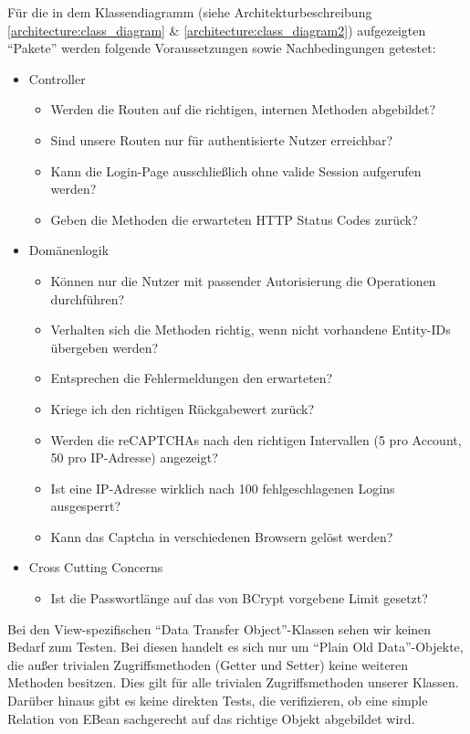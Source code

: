 \documentclass[12pt,DIV14,BCOR10mm,a4paper,parskip=half-,headsepline,headinclude,english,ngerman,bibliography=totocnumbered]{scrreprt}
\begin{document}

Für die in dem Klassendiagramm (siehe Architekturbeschreibung \ref{architecture:class_diagram} \& \ref{architecture:class_diagram2}) aufgezeigten \enquote{Pakete} werden folgende Voraussetzungen sowie Nachbedingungen getestet:

\begin{itemize}
  \item Controller
  \begin{itemize}
    \item Werden die Routen auf die richtigen, internen Methoden abgebildet?
    \item Sind unsere Routen nur für authentisierte Nutzer erreichbar?
    \item Kann die Login-Page ausschließlich ohne valide Session aufgerufen werden?
    \item Geben die Methoden die erwarteten HTTP Status Codes zurück?
  \end{itemize}

  \item Domänenlogik
  \begin{itemize}
    \item Können nur die Nutzer mit passender Autorisierung die Operationen durch\-führen?
    \item Verhalten sich die Methoden richtig, wenn nicht vorhandene Entity-IDs über\-geben werden?
    \item Entsprechen die Fehlermeldungen den erwarteten?
    \item Kriege ich den richtigen Rückgabewert zurück?
    \item Werden die reCAPTCHAs nach den richtigen Intervallen (5 pro Account, 50 pro IP-Adresse) angezeigt?
    \item Ist eine IP-Adresse wirklich nach 100 fehlgeschlagenen Logins ausgesperrt?
    \item Kann das Captcha in verschiedenen Browsern gelöst werden?
  \end{itemize}

  \item Cross Cutting Concerns
  \begin{itemize}
    \item Ist die Passwortlänge auf das von BCrypt vorgebene Limit gesetzt?
  \end{itemize}
\end{itemize}

Bei den View-spezifischen \enquote{Data Transfer Object}-Klassen sehen wir keinen Bedarf zum Testen.
Bei diesen handelt es sich nur um \enquote{Plain Old Data}-Objekte, die außer trivialen Zugriffsmethoden (Getter und Setter) keine weiteren Methoden besitzen.
Dies gilt für alle trivialen Zugriffsmethoden unserer Klassen. \newline
Darüber hinaus gibt es keine direkten Tests, die verifizieren, ob eine simple Relation von EBean sachgerecht auf das richtige Objekt abgebildet wird.
\end{document}
